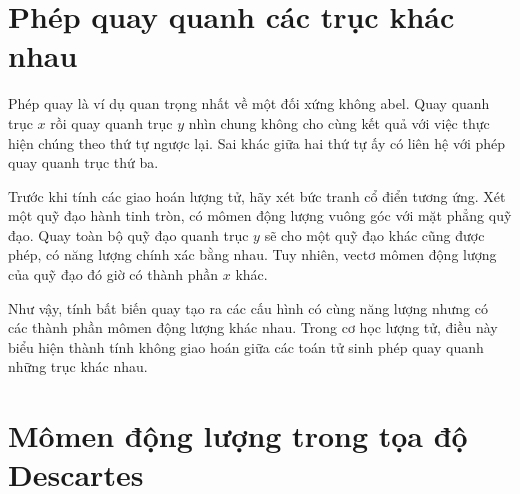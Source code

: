 \begin{classroomqa}
\end{classroomqa}

\section{Phép quay quanh các trục khác nhau}

Phép quay là ví dụ quan trọng nhất về một đối xứng không abel. Quay quanh trục \(x\) rồi quay quanh trục \(y\) nhìn chung không cho cùng kết quả với việc thực hiện chúng theo thứ tự ngược lại. Sai khác giữa hai thứ tự ấy có liên hệ với phép quay quanh trục thứ ba.

\begin{classroomqa}
\end{classroomqa}

Trước khi tính các giao hoán lượng tử, hãy xét bức tranh cổ điển tương ứng. Xét một quỹ đạo hành tinh tròn, có mômen động lượng vuông góc với mặt phẳng quỹ đạo. Quay toàn bộ quỹ đạo quanh trục \(y\) sẽ cho một quỹ đạo khác cũng được phép, có năng lượng chính xác bằng nhau. Tuy nhiên, vectơ mômen động lượng của quỹ đạo đó giờ có thành phần \(x\) khác.

Như vậy, tính bất biến quay tạo ra các cấu hình có cùng năng lượng nhưng có các thành phần mômen động lượng khác nhau. Trong cơ học lượng tử, điều này biểu hiện thành tính không giao hoán giữa các toán tử sinh phép quay quanh những trục khác nhau.

\section{Mômen động lượng trong tọa độ Descartes}

